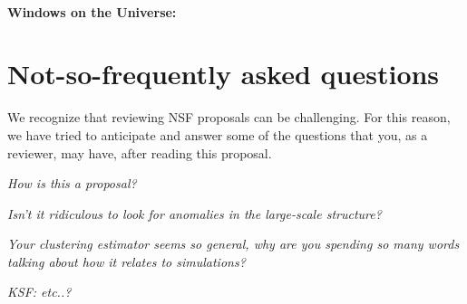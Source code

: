 \documentclass[12pt, fullpage, letterpaper]{article}
\begin{document}
\paragraph{Windows on the Universe:}

\section{Not-so-frequently asked questions}

We recognize that reviewing NSF proposals can be challenging.
For this reason, we have tried to anticipate and answer some of the
questions that you, as a reviewer, may have, after reading this
proposal.

\textit{How is this a  proposal?}

\textit{Isn't it ridiculous to look for anomalies in the large-scale structure?}

\textit{Your clustering estimator seems so general, why are you spending so many words talking about how it relates to simulations?}

\textit{KSF: etc..?}
\end{document}
